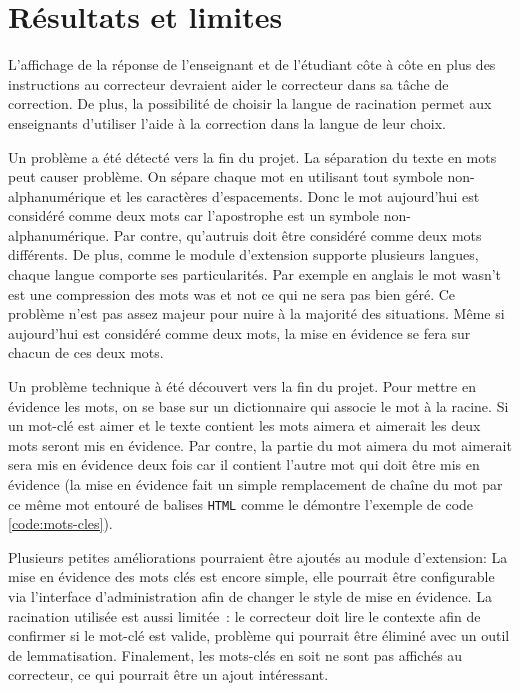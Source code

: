 \chapter{R\'esultats et limites}

L'affichage de la réponse de l'enseignant et de l'étudiant côte à côte en plus des instructions au correcteur devraient aider le correcteur dans sa tâche de correction.
De plus, la possibilit\'e de choisir la langue de racination permet aux enseignants d'utiliser l'aide \`a la correction dans la langue de leur choix.

Un probl\`eme a \'et\'e d\'etect\'e vers la fin du projet.
La s\'eparation du texte en mots peut causer probl\`eme.
On s\'epare chaque mot en utilisant tout symbole non-alphanum\'erique et les caract\`eres d'espacements.
Donc le mot \og aujourd'hui \fg{} est consid\'er\'e comme deux mots car l'apostrophe est un symbole non-alphanum\'erique.
Par contre, \og qu'autruis \fg{} doit \^etre consid\'er\'e comme deux mots diff\'erents.
De plus, comme le module d'extension supporte plusieurs langues, chaque langue comporte ses particularit\'es.
Par exemple en anglais le mot \og wasn't \fg{} est une compression des mots \og was \fg{} et \og not \fg{} ce qui ne sera pas bien g\'er\'e.
Ce probl\`eme n'est pas assez majeur pour nuire \`a la majorit\'e des situations.
M\^eme si \og aujourd'hui \fg{} est consid\'er\'e comme deux mots, la mise en \'evidence se fera sur chacun de ces deux mots.

Un probl\`eme technique \`a \'et\'e d\'ecouvert vers la fin du projet.
Pour mettre en \'evidence les mots, on se base sur un dictionnaire qui associe le mot \`a la racine.
Si un mot-cl\'e est \og aimer \fg{} et le texte contient les mots \og aimera \fg{} et \og aimerait \fg{} les deux mots seront mis en \'evidence.
Par contre, la partie du mot \og aimera \fg{} du mot \og aimerait \fg{} sera mis en \'evidence deux fois car il contient l'autre mot qui doit \^etre mis en \'evidence (la mise en \'evidence fait un simple remplacement de cha\^ine du mot par ce m\^eme mot entour\'e de balises \texttt{HTML} comme le d\'emontre l'exemple de code \ref{code:mots-cles}).

Plusieurs petites am\'eliorations pourraient \^etre ajout\'es au module d'extension:
La mise en évidence des mots clés est encore simple, elle pourrait être configurable via l'interface d'administration afin de changer le style de mise en évidence.
La racination utilisée est aussi limitée~: le correcteur doit lire le contexte afin de confirmer si le mot-clé est valide, problème qui pourrait être éliminé avec un outil de lemmatisation.
Finalement, les mots-clés en soit ne sont pas affichés au correcteur, ce qui pourrait être un ajout intéressant.

